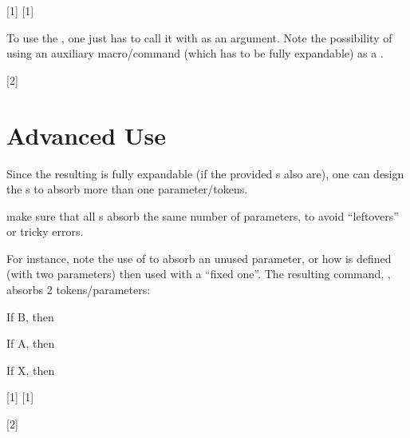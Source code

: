 \documentclass[10pt]{article}
\begin{document}
[1]
[1]

To use the , one just has to call it with  as an argument. Note the possibility of using an auxiliary macro/command (which has to be fully expandable) as a .


[2]

\section{Advanced Use}
Since the resulting  is fully expandable (if the provided s also are), one can design the s to absorb  more than one parameter/tokens.

\begin{tsremark}
  make sure that all s absorb the same number of parameters, to avoid ``leftovers'' or tricky errors.
\end{tsremark}

For instance, note the use of \tsobj{\@gobble} to absorb an unused parameter, or how \tsobj{\cmdY} is defined (with two parameters) then used with a ``fixed one''. The resulting command, \tsobj{\TCase}, absorbs 2 tokens/parameters:


\begin{codestore}[switch03]
If B, then \par
If A, then \par
If X, then \par
\end{codestore}

[1]
[1]



[2]
\end{document}
